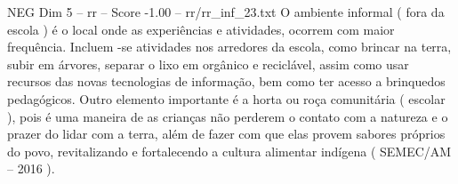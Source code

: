 \begin{textsample}{NEG Dim 5 – rr – Score -1.00 – rr/rr\_inf\_23.txt}
O ambiente informal ( fora da escola ) é o local onde as experiências e atividades, ocorrem com maior frequência.
Incluem -se atividades nos arredores da escola, como brincar na terra, subir em árvores, separar o lixo em orgânico e reciclável, assim como usar recursos das novas tecnologias de informação, bem como ter acesso a brinquedos pedagógicos.
Outro elemento importante é a horta ou roça comunitária ( escolar ), pois é uma maneira de as crianças não perderem o contato com a natureza e o prazer do lidar com a terra, além de fazer com que elas provem sabores próprios do povo, revitalizando e fortalecendo a cultura alimentar indígena ( SEMEC/AM – 2016 ).

\end{textsample}
